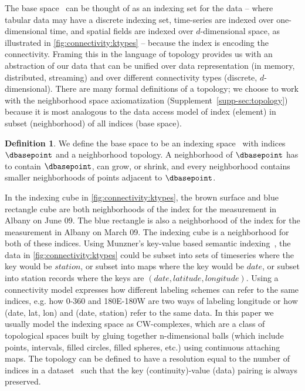 \documentclass{vgtc}
\theoremstyle{definition}
\newtheorem{definition}{Definition}[section]
\theoremstyle{remark}
\begin{document}
The base space \dbase\ can be thought of as an
indexing set for the data -- where tabular data may have a discrete indexing set, time-series are indexed over one-dimensional time, and spatial fields are indexed over $d$-dimensional space, as illustrated in \autoref{fig:connectivity:ktypes} -- because the index is encoding the connectivity. Framing this in the language of topology provides us with an abstraction of our data that can be unified over data representation (in memory, distributed, streaming) and over different connectivity types (discrete, $d$-dimensional). There are many formal definitions of a topology; we choose to work with the neighborhood space axiomatization (Supplement~\autoref{supp-sec:topology}) because it is most analogous to the data access model of index (element) in subset (neighborhood) of all indices (base space).

\begin{definition}
We define the \textcolor{base}{base space} to be an indexing space \dbasec\ with indices $\dbasepoint$ and a neighborhood topology. A neighborhood of  $\dbasepoint$ has to contain $\dbasepoint$, can grow, or shrink, and every neighborhood contains smaller neighborhoods of points adjacent to $\dbasepoint$. \end{definition}

\noindent In the indexing cube in \autoref{fig:connectivity:ktypes}, the brown surface and blue rectangle cube are both neighborhoods of the index for the measurement in Albany on June 09. The blue rectangle is also a neighborhood of the index for the measurement in Albany on March 09. The indexing cube is a neighborhood for both of these indices. Using Munzner's key-value based semantic indexing~\cite{munznerWhatDataAbstraction2014}, the data in \autoref{fig:connectivity:ktypes} could be subset into sets of timeseries where the key would be $station$, or subset into maps where the key would be $date$, or subset into station records where the keys are $(date, latitude, longitude)$. Using a connectivity model expresses how different labeling schemes can refer to the same indices, e.g. how 0-360 and 180E-180W are two ways of labeling longitude or how (date, lat, lon) and (date, station) refer to the same data. In this paper we usually model the indexing space as CW-complexes, which are a class of topological spaces built by gluing together n-dimensional balls (which include points, intervals, filled circles, filled spheres, etc.) using continuous attaching maps. The topology can be defined to have a resolution equal to the number of indices in a dataset~\cite{munkresElementsAlgebraicTopology1984} such that the key (continuity)-value (data) pairing is always preserved. 
\end{document}
